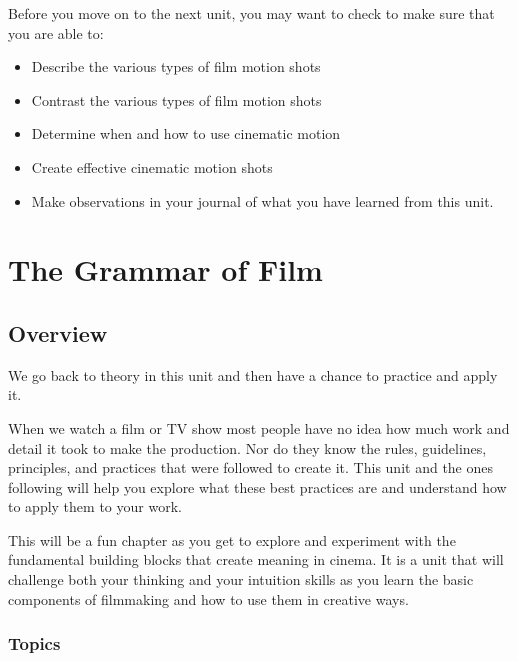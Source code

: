 \documentclass[
]{book}
\providecommand{\tightlist}{%
  \setlength{\itemsep}{0pt}\setlength{\parskip}{0pt}}
\begin{document}
\begin{progress}
Before you move on to the next unit, you may want to check to make sure that you are able to:

\begin{itemize}
\tightlist
\item
  Describe the various types of film motion shots
\item
  Contrast the various types of film motion shots
\item
  Determine when and how to use cinematic motion
\item
  Create effective cinematic motion shots
\item
  Make observations in your journal of what you have learned from this unit.
\end{itemize}
\end{progress}

\hypertarget{the-grammar-of-film}{%
\chapter{The Grammar of Film}\label{the-grammar-of-film}}

\hypertarget{overview-4}{%
\section*{Overview}\label{overview-4}}

We go back to theory in this unit and then have a chance to practice and apply it.

When we watch a film or TV show most people have no idea how much work and detail it took to make the production. Nor do they know the rules, guidelines, principles, and practices that were followed to create it. This unit and the ones following will help you explore what these best practices are and understand how to apply them to your work.

This will be a fun chapter as you get to explore and experiment with the fundamental building blocks that create meaning in cinema. It is a unit that will challenge both your thinking and your intuition skills as you learn the basic components of filmmaking and how to use them in creative ways.

\hypertarget{topics-4}{%
\subsection*{Topics}\label{topics-4}}
\end{document}
